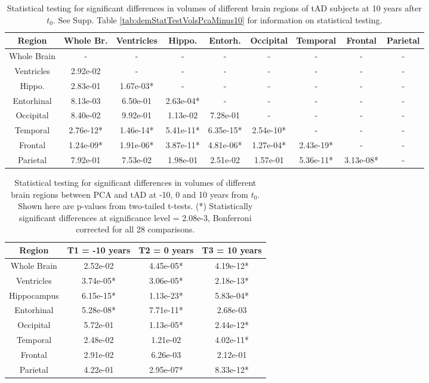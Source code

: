 \begin{table}
\centering
\begin{tabular}{c |c c c c c c c c }
Region & Whole Br. & Ventricles & Hippo. & Entorh. & Occipital & Temporal & Frontal & Parietal\\
\hline 
Whole Brain & - & - & - & - & - & - & - & -\\
Ventricles & 2.92e-02 & - & - & - & - & - & - & -\\
Hippo. & 2.83e-01 & 1.67e-03* & - & - & - & - & - & -\\
Entorhinal & 8.13e-03 & 6.50e-01 & 2.63e-04* & - & - & - & - & -\\
Occipital & 8.40e-02 & 9.92e-01 & 1.13e-02 & 7.28e-01 & - & - & - & -\\
Temporal & 2.76e-12* & 1.46e-14* & 5.41e-11* & 6.35e-15* & 2.54e-10* & - & - & -\\
Frontal & 1.24e-09* & 1.91e-06* & 3.87e-11* & 4.81e-06* & 1.27e-04* & 2.43e-19* & - & -\\
Parietal & 7.92e-01 & 7.53e-02 & 1.98e-01 & 2.51e-02 & 1.57e-01 & 5.36e-11* & 3.13e-08* & -\\
\end{tabular} 
\caption[Statistical testing for significant differences in volumes of different brain regions of tAD subjects at 10 years after $t_0$.]{Statistical testing for significant differences in volumes of different brain regions of tAD subjects at 10 years after $t_0$. See Supp. Table \ref{tab:demStatTestVolsPcaMinus10} for information on statistical testing.} 
\label{tab:demStatTestVolsPlus10}
\end{table}


\begin{table}
\centering
\begin{tabular}{c |c c c }
Region & T1 = -10 years &  T2 = 0 years &  T3 = 10 years\\
\hline
Whole Brain & 2.52e-02 & 4.45e-05* & 4.19e-12*\\
Ventricles & 3.74e-05* & 3.06e-05* & 2.18e-13*\\
Hippocampus & 6.15e-15* & 1.13e-23* & 5.83e-04*\\
Entorhinal & 5.28e-08* & 7.71e-11* & 2.68e-03\\
Occipital & 5.72e-01 & 1.13e-05* & 2.44e-12*\\
Temporal & 2.48e-02 & 1.21e-02 & 4.02e-11*\\
Frontal & 2.91e-02 & 6.26e-03 & 2.12e-01\\
Parietal & 4.22e-01 & 2.95e-07* & 8.33e-12*\\

\end{tabular}
\caption[Statistical testing for significant differences in volumes of different brain regions between PCA and tAD at -10, 0 and 10 years from $t_0$.]{Statistical testing for significant differences in volumes of different brain regions between PCA and tAD at -10, 0 and 10 years from $t_0$. Shown here are p-values from two-tailed t-tests. (*) Statistically significant differences at significance level = 2.08e-3, Bonferroni corrected for all 28 comparisons.}
\label{tab:demStatTestPcaAd}
\end{table}


